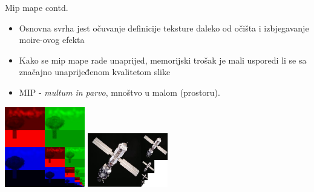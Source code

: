 \documentclass[9pt]{beamer}
\begin{document}
%
\begin{frame}{Mip mape contd.}
	\begin{block}{}
		\begin{itemize}
			\item Osnovna svrha jest očuvanje definicije teksture daleko od očišta i izbjegavanje moire-ovog efekta
			\item Kako se mip mape rade unaprijed, memorijski trošak je mali usporedi li se sa značajno unaprijeđenom kvalitetom 	
			slike
			\item MIP  - \textit{multum in parvo}, \small{mnoštvo u malom (prostoru)}.
		\end{itemize}
	\end{block}
	\begin{center}
		\includegraphics[width=3.5cm]{slike/06_mipmap_tekstura.png}
		\includegraphics[width=3.5cm]{slike/mip_mapa.png}
	\end{center}
\end{frame}
\end{document}
